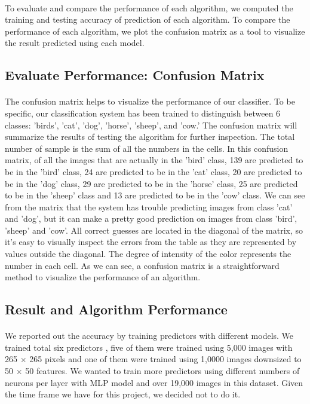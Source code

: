\documentclass{article}
\begin{document}
\paragraph{}
To evaluate and compare the performance of each algorithm, we computed the training and testing accuracy of prediction of each algorithm. To compare the performance of each algorithm, we plot the confusion matrix as a tool to visualize the result predicted using each model.
\subsection{Evaluate Performance: Confusion Matrix}
\paragraph{}
The confusion matrix helps to visualize the performance of our classifier. To be specific, our classification system has been trained to distinguish between 6 classes: 'birds', 'cat', 'dog', 'horse', 'sheep', and 'cow.' The confusion matrix will summarize the results of testing the algorithm for further inspection. The total number of sample is the sum of all the numbers in the cells. In this confusion matrix, of all the images that are actually in the 'bird' class, 139 are predicted to be in the 'bird' class, 24 are predicted to be in the 'cat' class, 20 are predicted to be in the 'dog' class, 29 are predicted to be in the 'horse' class, 25 are predicted to be in the 'sheep' class and 13 are predicted to be in the 'cow' class. We can see from the matrix that the system has trouble predicting images from class 'cat' and 'dog', but it can  make a pretty good prediction on images from class 'bird', 'sheep' and 'cow'. All correct guesses are located in the diagonal of the matrix, so it's easy to visually inspect the errors from the table as they are represented by values outside the diagonal. The degree of intensity of the color represents the number in each cell. As we can see, a confusion matrix is a straightforward method to visualize the performance of an algorithm.

\subsection{Result and Algorithm Performance} 
\paragraph{}
We reported out the accuracy by training predictors with different models. We trained total six predictors , five of them were trained using 5,000 images with 265 $\times$ 265 pixels and one of them were trained using 1,0000 images downsized to 50 $\times$ 50 features. We wanted to train more predictors using different numbers of neurons per layer with MLP model and over 19,000 images in this dataset. Given the time frame we have for this project, we decided not to do it.
\end{document}
